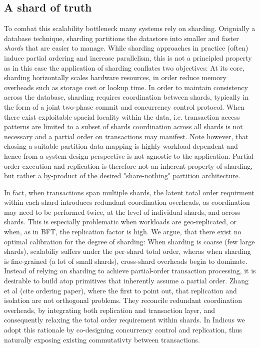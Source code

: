 \subsection{A shard of truth}
To combat this scalability bottleneck many systems rely on sharding. Orignially a database technique, sharding partitions the datastore into smaller and faster \textit{shards} that are easier to manage. While sharding approaches in practice (often) induce partial ordering and increase parallelism, this is not a principled property as in this case the application of sharding conflates two objectives:
At its core, sharding horizontally scales hardware resources, in order reduce memory overheads such as storage cost or lookup time. In order to maintain consistency across the database, sharding requires coordination between shards, typically in the form of a joint two-phase commit and concurrency control protocol. 
When there exist exploitable spacial locality within the data, i.e. transaction access patterns are limited to a subset of shards coordination across all shards is not necessary and a partial order on transactions may manifest. Note however, that chosing a suitable partition data mapping is highly workload dependent and hence from a system design perspective is not agnostic to the application.
Partial order execution and replication is therefore not an inherent property of sharding, but rather a by-product of the desired "share-nothing" partition architecture. 

In fact, when transactions span multiple shards, the latent total order requirment within each shard introduces redundant coordination overheads, as coordination may need to be performed twice, at the level of individual shards, and across shards. This is especially problematic when workloads are geo-replicated, or when, as in BFT, the replication factor is high. 
We argue, that there exist no optimal calibration for the degree of sharding: When sharding is coarse (few large shards), scalabiliy suffers under the per-shard total order, wheras when sharding is fine-grained (a lot of small shards), cross-shard overheads begin to dominate. 
Instead of relying on sharding to achieve partial-order transaction processing, it is desirable to build atop primitives that inherently assume a partial order.
Zhang et al (cite ordering paper), where the first to point out, that replication and isolation are not orthogonal problems. They reconcile redundant coordination overheads, by integrating both replication and transaction layer, and consequently relaxing the total order requirement within shards.
In Indicus we adopt this rationale by co-designing concurrency control and replication, thus naturally exposing existing commutativty between transactions.



